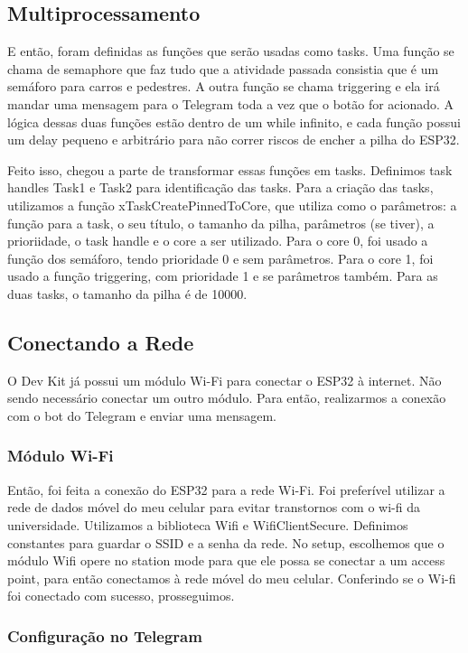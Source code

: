 \documentclass[12pt]{article}
\begin{document}
\subsection{Multiprocessamento}

E então, foram definidas as funções que serão usadas como tasks. Uma função se chama de semaphore que faz tudo que a atividade passada consistia que é um semáforo para carros e pedestres. A outra função se chama triggering e ela irá mandar uma mensagem para o Telegram toda a vez que o botão for acionado. A lógica dessas duas funções estão dentro de um while infinito, e cada função possui um delay pequeno e arbitrário para não correr riscos de encher a pilha do ESP32.

Feito isso, chegou a parte de transformar essas funções em tasks. Definimos task handles Task1 e Task2 para identificação das tasks. Para a criação das tasks, utilizamos a função xTaskCreatePinnedToCore, que utiliza como o parâmetros: a função para a task, o seu título, o tamanho da pilha, parâmetros (se tiver), a prioriidade, o task handle e o core a ser utilizado. Para o core 0, foi usado a função dos semáforo, tendo prioridade 0 e sem parâmetros. Para o core 1, foi usado a função triggering, com prioridade 1 e se parâmetros também. Para as duas tasks, o tamanho da pilha é de 10000.

\subsection{Conectando a Rede}

O Dev Kit já possui um módulo Wi-Fi para conectar o ESP32 à internet. Não sendo necessário conectar um outro módulo. Para então, realizarmos a conexão com o bot do Telegram e enviar uma mensagem.

\subsubsection{Módulo Wi-Fi}
Então, foi feita a conexão do ESP32 para a rede Wi-Fi. Foi preferível utilizar a rede de dados móvel do meu celular para evitar transtornos com o wi-fi da universidade. Utilizamos a biblioteca Wifi e WifiClientSecure. Definimos constantes para guardar o SSID e a senha da rede. No setup, escolhemos que o módulo Wifi opere no station mode para que ele possa se conectar a um access point, para então conectamos à rede móvel do meu celular. Conferindo se o Wi-fi foi conectado com sucesso, prosseguimos.

\subsubsection{Configuração no Telegram}
\end{document}
